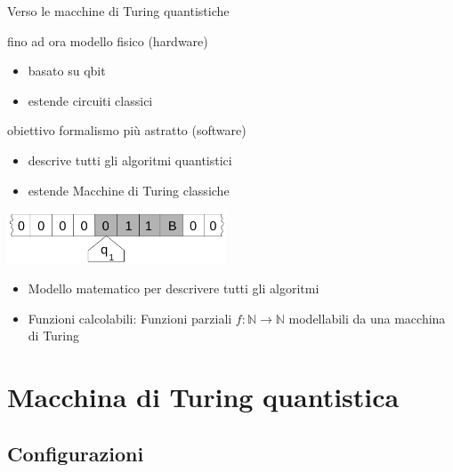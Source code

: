 \documentclass{beamer}
\begin{document}
\begin{frame}{Verso le macchine di Turing quantistiche}
	\begin{block}{fino ad ora}
		modello fisico (hardware)
		\begin{itemize}
			\item basato su qbit
			\item estende circuiti classici
		\end{itemize}
	\end{block}

	\pause \vspace{2ex}

	\begin{block}{obiettivo}
		formalismo più astratto (software)
		\begin{itemize}
			\item descrive tutti gli algoritmi quantistici
			\item estende Macchine di Turing classiche
		\end{itemize}
	\end{block}
\end{frame}

\begin{frame}{\subsecname}{}
	\centering\includegraphics[width=6.5cm]{Turing_machine_2b.png}
	\begin{itemize}
		\item<+-> Modello matematico per descrivere tutti gli algoritmi
		\item<+-> \alert{Funzioni calcolabili}: Funzioni parziali \( f : \mathbb{N} \rightarrow \mathbb{N} \) modellabili da una macchina di Turing
	\end{itemize}
\end{frame}

\section{Macchina di Turing quantistica}

\subsection{Configurazioni}
\end{document}
